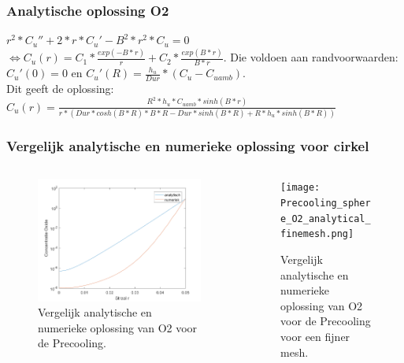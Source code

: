 \documentclass{beamer}
\begin{document}
\begin{frame}
\frametitle{Analytische oplossing O2}
$r^2*C_u'' +2*r*C_u' - B^2*r^2*C_u = 0$ \\ $ \Leftrightarrow C_u(r) = C_1*\frac{exp(-B*r)}{r}+C_2*\frac{exp(B*r)}{B*r}$. Die voldoen aan randvoorwaarden: $C_u'(0) = 0$ en $ C_u'(R) = \frac{h_u}{Dur}*(C_u-C_{uamb})$.\\
Dit geeft de oplossing:\\
$ C_u(r)= \frac{R^2*h_u*C_{uamb}*sinh(B*r)}{r*(Dur*cosh(B*R)*B*R-Dur*sinh(B*R)+R*h_u*sinh(B*R))}$
\end{frame}

\begin{frame}
\frametitle{Vergelijk analytische en numerieke oplossing voor cirkel}
\begin{columns}
\begin{column}{0.48\textwidth}
\begin{figure}
\includegraphics[width = 1\textwidth]{Precooling_sphere_O2_analytical.png}
\caption{Vergelijk analytische en numerieke oplossing van O2 voor de Precooling.}
\end{figure}
\end{column}
	
\begin{column}{0.48\textwidth}
\begin{figure}
\texttt{[image: Precooling\_sphere\_O2\_analytical\_finemesh.png]}
\caption{Vergelijk analytische en numerieke oplossing van O2 voor de Precooling voor een fijner mesh.}
\end{figure}
\end{column}
\end{columns}
\end{frame}
\end{document}
